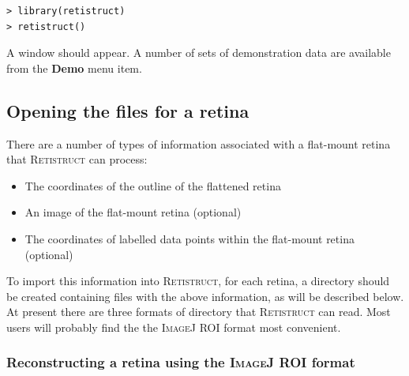 \documentclass{article}
\begin{document}
\begin{verbatim}
> library(retistruct)
> retistruct()
\end{verbatim}
A window should appear. A number of sets of demonstration data are
available from the \textbf{Demo} menu item.

\subsection{Opening the files for a retina}
\label{manual:sec:opening-files-retina}

There are a number of types of information associated with a
flat-mount retina that \textsc{Retistruct} can process:
\begin{itemize}
\item The coordinates of the outline of the flattened retina
\item An image of the flat-mount retina (optional)
\item The coordinates of labelled data points within the flat-mount
  retina (optional)
\end{itemize}
To import this information into \textsc{Retistruct}, for each retina,
a directory should be created containing files with the above
information, as will be described below.  At present there are three
formats of directory that \textsc{Retistruct} can read.  Most users
will probably find the the \textsc{ImageJ} ROI format most convenient.

\subsubsection{Reconstructing a retina using the \textsc{ImageJ} ROI format}
\label{retistruct-manual:sec:ijroi-format}
\end{document}
